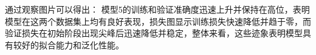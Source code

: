 通过观察图片可以得出：
模型5的训练和验证准确度迅速上升并保持在高位，表明模型在这两个数据集上均有良好表现，损失图显示训练损失快速降低并趋于零，而验证损失在初始阶段出现尖峰后迅速降低并稳定，整体来看，这些迹象表明模型具有较好的拟合能力和泛化性能。









\FloatBarrier